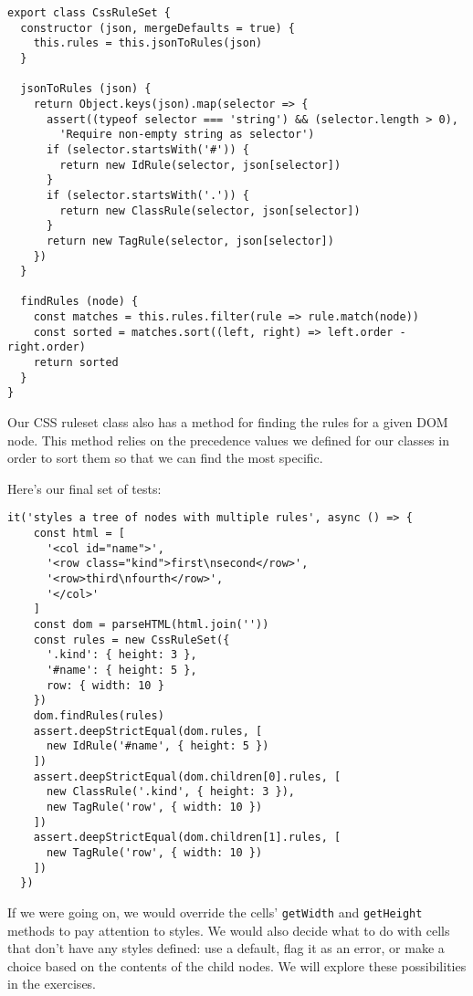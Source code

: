 \documentclass[krantzl]{krantz}
\begin{document}
\begin{lstlisting}[frame=tblr]
export class CssRuleSet {
  constructor (json, mergeDefaults = true) {
    this.rules = this.jsonToRules(json)
  }

  jsonToRules (json) {
    return Object.keys(json).map(selector => {
      assert((typeof selector === 'string') && (selector.length > 0),
        'Require non-empty string as selector')
      if (selector.startsWith('#')) {
        return new IdRule(selector, json[selector])
      }
      if (selector.startsWith('.')) {
        return new ClassRule(selector, json[selector])
      }
      return new TagRule(selector, json[selector])
    })
  }

  findRules (node) {
    const matches = this.rules.filter(rule => rule.match(node))
    const sorted = matches.sort((left, right) => left.order - right.order)
    return sorted
  }
}
\end{lstlisting}



Our CSS ruleset class also has a method for finding the rules for a given DOM node.
This method relies on the precedence values we defined for our classes
in order to sort them
so that we can find the most specific.


Here’s our final set of tests:


\begin{lstlisting}[frame=tblr]
  it('styles a tree of nodes with multiple rules', async () => {
    const html = [
      '<col id="name">',
      '<row class="kind">first\nsecond</row>',
      '<row>third\nfourth</row>',
      '</col>'
    ]
    const dom = parseHTML(html.join(''))
    const rules = new CssRuleSet({
      '.kind': { height: 3 },
      '#name': { height: 5 },
      row: { width: 10 }
    })
    dom.findRules(rules)
    assert.deepStrictEqual(dom.rules, [
      new IdRule('#name', { height: 5 })
    ])
    assert.deepStrictEqual(dom.children[0].rules, [
      new ClassRule('.kind', { height: 3 }),
      new TagRule('row', { width: 10 })
    ])
    assert.deepStrictEqual(dom.children[1].rules, [
      new TagRule('row', { width: 10 })
    ])
  })
\end{lstlisting}



If we were going on,
we would override the cells’ \texttt{getWidth} and \texttt{getHeight} methods to pay attention to styles.
We would also decide what to do with cells that don’t have any styles defined:
use a default,
flag it as an error,
or make a choice based on the contents of the child nodes.
We will explore these possibilities in the exercises.
\end{document}
